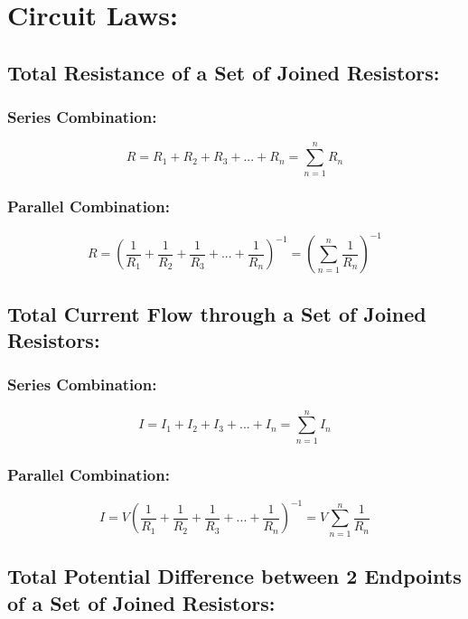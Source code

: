 \documentclass[a4paper]{report}
\begin{document}
    \section{Circuit Laws:}
        \subsection{Total Resistance of a Set of Joined Resistors:}
            \subsubsection{Series Combination:}
                \begin{equation}
                    R = R_1 + R_2 + R_3 + ... + R_n = \sum_{n = 1}^n R_n
                \end{equation}
            \subsubsection{Parallel Combination:}
                \begin{equation}
                    R = (\frac{1}{R_1} + \frac{1}{R_2} + \frac{1}{R_3} + ... + \frac{1}{R_n})^{-1} = (\sum_{n = 1}^{n} \frac{1}{R_n})^{-1}
                \end{equation}
        \subsection{Total Current Flow through a Set of Joined Resistors:}
            \subsubsection{Series Combination:}
                \begin{equation}
                    I = I_1 + I_2 + I_3 + ... + I_n = \sum_{n = 1}^n I_n
                \end{equation}
            \subsubsection{Parallel Combination:}
                \begin{equation}
                    I = V(\frac{1}{R_1} + \frac{1}{R_2} + \frac{1}{R_3} + ... + \frac{1}{R_n})^{-1} = V \sum_{n = 1}^{n} \frac{1}{R_n}
                \end{equation}
        \subsection{Total Potential Difference between 2 Endpoints of a Set of Joined Resistors:}
\end{document}
